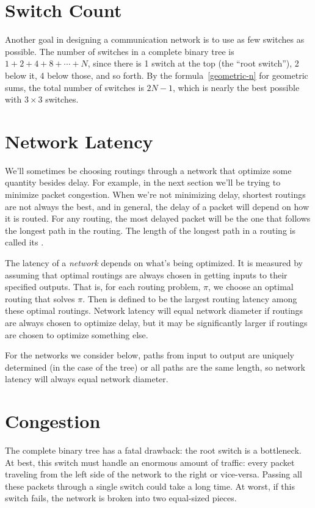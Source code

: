 \section{Switch Count}

Another goal in designing a communication network is to use as few
switches as possible.  The number of switches in a complete binary tree is
$1 + 2 + 4 + 8 + \cdots + N$, since there is 1 switch at the top (the
``root switch''), 2 below it, 4 below those, and so forth.  By the
formula~\eqref{geometric-n} for geometric sums, the total number of
switches is $2 N - 1$, which is nearly the best possible with $3 \times 3$
switches.

\section{Network  Latency}

We'll sometimes be choosing routings through a network that optimize some
quantity besides delay.  For example, in the next section we'll be trying
to minimize packet congestion.  When we're not minimizing delay, shortest
routings are not always the best, and in general, the delay of a packet
will depend on how it is routed.  For any routing, the most delayed packet
will be the one that follows the longest path in the routing.  The length
of the longest path in a routing is called its .


The latency of a \emph{network} depends on what's being optimized.  It is
measured by assuming that optimal routings are always chosen in getting
inputs to their specified outputs.  That is, for each routing problem,
$\pi$, we choose an optimal routing that solves $\pi$.  Then  is defined to be the largest routing latency among these
optimal routings.  Network latency will equal network diameter if routings
are always chosen to optimize delay, but it may be significantly larger if
routings are chosen to optimize something else.

For the networks we consider below, paths from input to output are
uniquely determined (in the case of the tree) or all paths are the same
length, so network latency will always equal network diameter.


\section{Congestion}

The complete binary tree has a fatal drawback: the root switch is a
bottleneck.  At best, this switch must handle an enormous amount of
traffic: every packet traveling from the left side of the network to the
right or vice-versa.  Passing all these packets through a single switch
could take a long time.  At worst, if this switch fails, the network is
broken into two equal-sized pieces.


